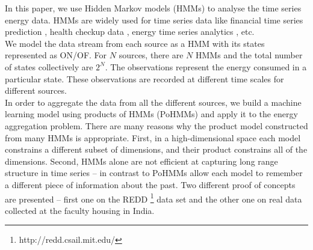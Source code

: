 \documentclass{sig-alternate}
\begin{document}
In this paper, we use Hidden Markov models (HMMs) to analyse the time series energy data. HMMs are widely used for time series data like financial time series prediction \cite{SS97a}, health checkup data \cite{Kawamoto}, energy time series analytics \cite{Albert}, etc.\\
We model the data stream from each source as a HMM with its states represented as ON/OF.  For $N$ sources, there are $N$ HMMs and  the total number of states collectively are $2^N$. The observations represent the energy consumed in a particular state. These observations are recorded at different time scales for different sources. \\
In order to aggregate the data from all the different sources, we build a machine learning model using products of HMMs (PoHMMs) and apply it to the energy aggregation problem. There are many reasons why the product model constructed from many HMMs is appropriate. 
First, in a high-dimensional space each model constrains a different subset of dimensions, and their product constrains all of the dimensions.
Second, HMMs alone are not efficient at capturing long range structure in time series \cite{Taylor} -- in contrast to PoHMMs  \cite{andrew} allow each model to remember a different piece of information about the past.
Two different proof of concepts are presented -- first one on the REDD \footnote{http://redd.csail.mit.edu/} data set and the other one on real data collected at the faculty housing in India. 

\end{document}
